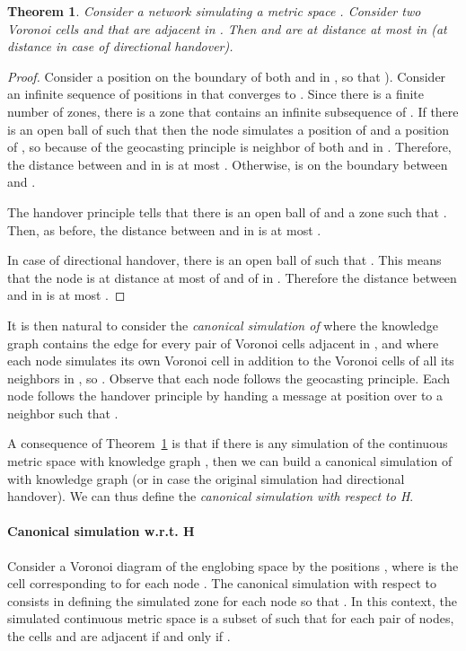 \documentclass{article}
\newtheorem{theorem}{Theorem}
\begin{document}
\begin{theorem}
Consider a network  simulating a metric space . Consider two Voronoi cells  and  that are adjacent in . Then  and  are at distance at most  in  (at distance  in case of directional handover).
\label{th_voronoi}
\end{theorem}

\begin{proof}
Consider a position  on the boundary of both  and  in , so that ). Consider an infinite sequence  of positions in  that converges to . Since there is a finite number of zones, there is a zone  that contains an infinite subsequence of . 
If there is an open ball  of  such that  then the node  simulates a position of  and a position of , so because of the geocasting principle  is neighbor of both  and  in . Therefore, the distance between  and  in  is at most .
Otherwise,  is on the boundary between  and .

The handover principle tells that there is an open ball  of  and a zone  such that . Then, as before, the distance between  and  in  is at most .

In case of directional handover, there is an open ball  of  such that . This means that the node  is at distance at most  of  and  of  in . Therefore the distance between  and  in  is at most .
\end{proof}

It is then natural to consider the {\em canonical simulation of } where the knowledge graph  contains the edge  for every pair   of Voronoi cells adjacent in , and where each node  simulates its own Voronoi cell in addition to the Voronoi cells of all its neighbors in , so . 
Observe that each node  follows the geocasting principle. Each node  follows the handover principle by handing a message at position  over to a neighbor  such that .

A consequence of Theorem~\ref{th_voronoi} is that if there is any simulation of the continuous metric space  with knowledge graph , then we can build a canonical simulation of  with knowledge graph  (or  in case the original simulation had directional handover). We can thus define the {\em canonical simulation with respect to H}.

\paragraph{Canonical simulation w.r.t. H} Consider a Voronoi diagram of the englobing space  by the positions , where  is the cell corresponding to  for each node . The canonical simulation with respect to  consists in defining the simulated zone  for each node  so that . In this context, the simulated continuous metric space  is a subset of  such that for each pair  of nodes, the cells  and  are adjacent if and only if .
\end{document}
